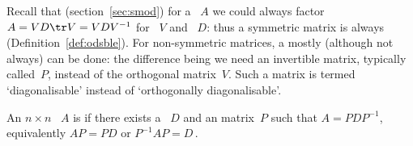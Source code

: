 Recall that (section~\ref{sec:smod}) for a ~\(A\) we could always factor \(A=VD\tr V=VDV^{-1}\) for ~\(V\) and ~\(D\): thus a symmetric matrix is always  (Definition~\ref{def:odsble}).
For non-symmetric matrices, a  mostly (although not always) can be done:
the difference being we need an invertible matrix, typically called~\(P\), instead of the orthogonal matrix~\(V\).
Such a matrix is termed `diagonalisable' instead of `orthogonally diagonalisable'.


\begin{definition} \label{def:diagonalise} 
An \(n\times n\) ~\(A\) is  if there exists a ~\(D\) and an  matrix~\(P\) such that \(A=PDP^{-1}\), equivalently \(AP=PD\) or \(P^{-1}AP=D\)\,.
\end{definition}


